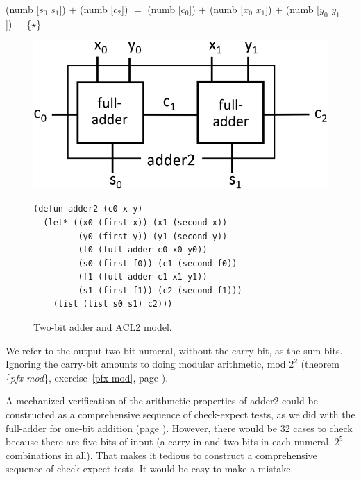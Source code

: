 \begin{center}
\textsf{(numb [$s_0$ $s_1$]) $+$ (numb [$c_2$])} $=$
\textsf{(numb [$c_0$]) $+$ (numb [$x_0$ $x_1$]) $+$ (numb [$y_0$ $y_1$])}~~~\{$\star$\}
\end{center}

\begin{figure}
\includegraphics[scale=1]{images-cmyk/adder2}
\begin{code}
\begin{verbatim}
(defun adder2 (c0 x y)
  (let* ((x0 (first x)) (x1 (second x))
         (y0 (first y)) (y1 (second y))
         (f0 (full-adder c0 x0 y0))
         (s0 (first f0)) (c1 (second f0))
         (f1 (full-adder c1 x1 y1))
         (s1 (first f1)) (c2 (second f1)))
    (list (list s0 s1) c2)))
\end{verbatim}
\end{code}
\caption{Two-bit adder and ACL2 model.}
\label{fig:adder2}
\end{figure}

We refer to the output two-bit numeral, without the carry-bit,
as the sum-bits.
Ignoring the carry-bit amounts to doing modular arithmetic, mod $2^2$
(theorem \{\emph{pfx-mod}\}, exercise~\ref{pfx-mod}, page \pageref{pfx-mod}).

A mechanized verification of the arithmetic properties of \textsf{adder2}
could be constructed as a comprehensive sequence of \textsf{check-expect} tests,
as we did with the \textsf{full-adder} for one-bit addition
(page \pageref{full-adder-model-check}).
However, there would be 32 cases to check
because there are five bits of input
(a carry-in and two bits in each numeral, $2^5$ combinations in all).
That makes it tedious to construct a comprehensive sequence of \textsf{check-expect} tests.
It would be easy to make a mistake.

